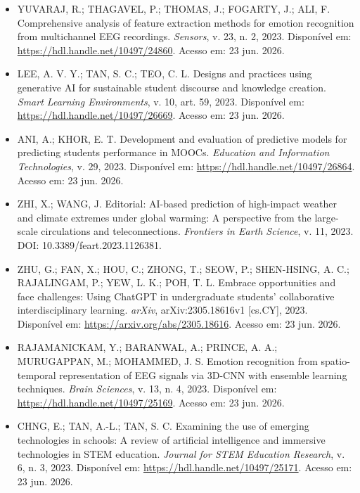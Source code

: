 \documentclass[english]{textolivre}
\begin{document}
\begin{itemize}
\item[] YUVARAJ, R.; THAGAVEL, P.; THOMAS, J.; FOGARTY, J.; ALI, F. Comprehensive analysis of feature extraction methods for emotion recognition from multichannel EEG recordings. \textit{Sensors}, v. 23, n. 2, 2023. Disponível em: \url{https://hdl.handle.net/10497/24860}. Acesso em: 23 jun. 2026.

\item[] LEE, A. V. Y.; TAN, S. C.; TEO, C. L. Designs and practices using generative AI for sustainable student discourse and knowledge creation. \textit{Smart Learning Environments}, v. 10, art. 59, 2023. Disponível em: \url{https://hdl.handle.net/10497/26669}. Acesso em: 23 jun. 2026.

\item[] ANI, A.; KHOR, E. T. Development and evaluation of predictive models for predicting students performance in MOOCs. \textit{Education and Information Technologies}, v. 29, 2023. Disponível em: \url{https://hdl.handle.net/10497/26864}. Acesso em: 23 jun. 2026.

\item[] ZHI, X.; WANG, J. Editorial: AI-based prediction of high-impact weather and climate extremes under global warming: A perspective from the large-scale circulations and teleconnections. \textit{Frontiers in Earth Science}, v. 11, 2023. DOI: 10.3389/feart.2023.1126381.

\item[] ZHU, G.; FAN, X.; HOU, C.; ZHONG, T.; SEOW, P.; SHEN-HSING, A. C.; RAJALINGAM, P.; YEW, L. K.; POH, T. L. Embrace opportunities and face challenges: Using ChatGPT in undergraduate students’ collaborative interdisciplinary learning. \textit{arXiv}, arXiv:2305.18616v1 [cs.CY], 2023. Disponível em: \url{https://arxiv.org/abs/2305.18616}. Acesso em: 23 jun. 2026.

\item[] RAJAMANICKAM, Y.; BARANWAL, A.; PRINCE, A. A.; MURUGAPPAN, M.; MOHAMMED, J. S. Emotion recognition from spatio-temporal representation of EEG signals via 3D-CNN with ensemble learning techniques. \textit{Brain Sciences}, v. 13, n. 4, 2023. Disponível em: \url{https://hdl.handle.net/10497/25169}. Acesso em: 23 jun. 2026.

\item[] CHNG, E.; TAN, A.-L.; TAN, S. C. Examining the use of emerging technologies in schools: A review of artificial intelligence and immersive technologies in STEM education. \textit{Journal for STEM Education Research}, v. 6, n. 3, 2023. Disponível em: \url{https://hdl.handle.net/10497/25171}. Acesso em: 23 jun. 2026.


\end{itemize}
\end{document}
